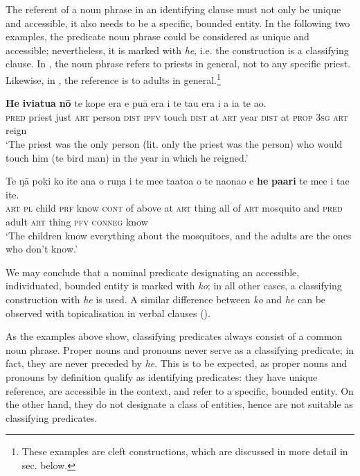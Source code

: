 The referent of a noun phrase in an identifying clause must not only be unique and accessible, it also needs to be a specific, bounded entity. In the following two examples, the predicate noun phrase could be considered as unique and accessible; nevertheless, it is marked with \textit{he}, i.e. the construction is a classifying clause. In , the noun phrase refers to priests in general, not to any specific priest. Likewise, in , the reference is to adults in general.\footnote{\label{fn:466}These examples are cleft constructions, which are discussed in more detail in sec.  below.}

\ea\label{ex:9.25}
\gll \textbf{He} \textbf{ivi{\ꞌ}atua} \textbf{nō} te kope era e puā era {\ꞌ}i te ta{\ꞌ}u era i a ia te {\ꞌ}ao. \\
\textsc{pred} priest just \textsc{art} person \textsc{dist} \textsc{ipfv} touch \textsc{dist} at \textsc{art} year \textsc{dist} at \textsc{prop} \textsc{3sg} \textsc{art} reign \\

\glt 
‘The priest was the only person (lit. only the priest was the person) who would touch him (te bird man) in the year in which he reigned.’ \textstyleExampleref{[R641.008]} 
\z

\ea\label{ex:9.26}
\gll Te ŋā poki ko {\ꞌ}ite {\ꞌ}ana o ruŋa i te me{\ꞌ}e ta{\ꞌ}ato{\ꞌ}a o te naonao {\ꞌ}e \textbf{he} \textbf{pa{\ꞌ}ari} te me{\ꞌ}e i ta{\ꞌ}e {\ꞌ}ite. \\
\textsc{art} \textsc{pl} child \textsc{prf} know \textsc{cont} of above at \textsc{art} thing all of \textsc{art} mosquito and \textsc{pred} adult \textsc{art} thing \textsc{pfv} \textsc{conneg} know \\

\glt 
‘The children know everything about the mosquitoes, and the adults are the ones who don’t know.’ \textstyleExampleref{[R535.159]} 
\z

We may conclude that a nominal predicate designating an accessible, individuated, bounded entity is marked with \textit{ko}; in all other cases, a classifying construction with \textit{he} is used. A similar difference between \textit{ko} and \textit{he} can be observed with topicalisation in verbal clauses ().

As the examples above show, classifying predicates always consist of a common noun phrase. Proper nouns and pronouns never serve as a classifying predicate; in fact, they are never preceded by \textit{he}. This is to be expected, as proper nouns and pronouns by definition qualify as identifying predicates: they have unique reference, are accessible in the context, and refer to a specific, bounded entity. On the other hand, they do not designate a class of entities, hence are not suitable as classifying predicates.

